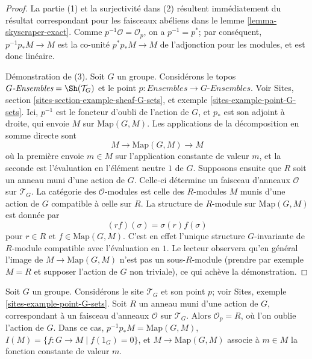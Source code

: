 \begin{proof}
La partie (1) et la surjectivité dans (2) résultent immédiatement du résultat
correspondant pour les faisceaux abéliens dans le
lemme \ref{lemma-skyscraper-exact}. Comme
$p^{-1}\mathcal{O} = \mathcal{O}_p$, on a $p^{-1} = p^*$; par conséquent,
$p^{-1}p_*M \to M$ est la co-unité $p^*p_*M \to M$ de l'adjonction pour les
modules, et est donc linéaire.

\medskip\noindent
Démonstration de (3). Soit $G$ un groupe. Considérons le topos
$G\textit{-Ensembles} = \Sh(\mathcal{T}_G)$
et le point $p : \textit{Ensembles} \to G\textit{-Ensembles}$. Voir Sites,
section \ref{sites-section-example-sheaf-G-sets}, et
exemple \ref{sites-example-point-G-sets}. Ici, $p^{-1}$ est le foncteur
d'oubli de l'action de $G$, et $p_*$ est son adjoint à droite, qui envoie
$M$ sur $\text{Map}(G, M)$. Les applications de la décomposition en somme
directe sont
$$
M \to \text{Map}(G, M) \to M
$$
où la première envoie $m \in M$ sur l'application constante de valeur $m$, et
la seconde est l'évaluation en l'élément neutre $1$ de $G$.
Supposons ensuite que $R$ soit un anneau muni d'une action de $G$. Celle-ci
détermine un faisceau d'anneaux $\mathcal{O}$ sur $\mathcal{T}_G$. La catégorie
des $\mathcal{O}$-modules est celle des $R$-modules $M$ munis d'une action de
$G$ compatible à celle sur $R$. La structure de $R$-module sur
$\text{Map}(G, M)$ est donnée par
$$
( r f ) (\sigma) = \sigma(r) f(\sigma)
$$
pour $r \in R$ et $f \in \text{Map}(G, M)$. C'est en effet l'unique structure
$G$-invariante de $R$-module compatible avec l'évaluation en $1$. Le lecteur
observera qu'en général l'image de $M \to \text{Map}(G, M)$ n'est pas un
sous-$R$-module (prendre par exemple $M = R$ et supposer l'action de $G$ non
triviale), ce qui achève la démonstration.
\end{proof}

\begin{example}
\label{example-ring-with-group-action}
Soit $G$ un groupe. Considérons le site $\mathcal{T}_G$ et son point $p$;
voir Sites, exemple \ref{sites-example-point-G-sets}. Soit $R$ un anneau muni
d'une action de $G$, correspondant à un faisceau d'anneaux $\mathcal{O}$ sur
$\mathcal{T}_G$. Alors $\mathcal{O}_p = R$, où l'on oublie l'action de $G$.
Dans ce cas, $p^{-1}p_*M = \text{Map}(G, M)$,
$I(M) = \{f : G \to M \mid f(1_G) = 0\}$, et
$M \to \text{Map}(G, M)$ associe à $m \in M$ la fonction constante de valeur $m$.
\end{example}




